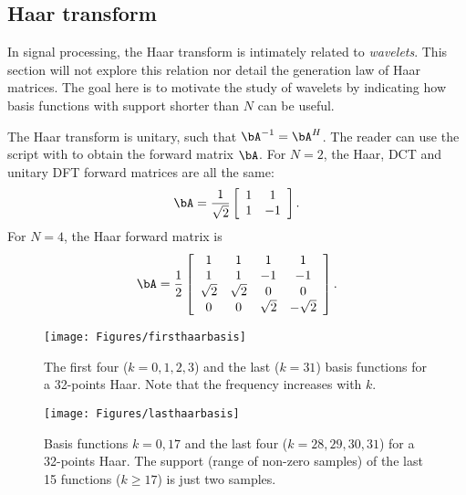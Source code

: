 \subsection{Haar transform}

In signal processing, the Haar transform is intimately related to \emph{wavelets}. This section will not explore this relation nor detail the generation law of Haar matrices. The goal here is to motivate the study of wavelets by indicating how basis functions with support shorter than $N$ can be useful.

The Haar transform is unitary, such that $\bA^{-1}=\bA^H$.
The reader can use the script  with  to obtain the forward matrix $\bA$. For $N=2$, the Haar, DCT and unitary DFT forward matrices are all the same:
\[
\bA = \frac{1}{\sqrt{2}}
\left[ \begin{array}{cc}
1 & 1 \\
1 & -1
\\ \end{array} \right].
\]
For $N=4$, the Haar forward matrix is
\[
\bA = \frac{1}{2}
\left[ \begin{array}{cccc}
1 & 1 & 1 & 1 \\
1 & 1 & -1 & -1 \\
\sqrt{2} & \sqrt{2} & 0 & 0 \\
0 & 0 & \sqrt{2} & -\sqrt{2}
\\ \end{array} \right].
\]

\begin{figure}[htpb]
        \centering
                \texttt{[image: Figures/firsthaarbasis]}              
        \caption[{The first four ($k=0,1,2,3$) and the last ($k=31$) basis functions for a 32-points Haar.}]{The first four ($k=0,1,2,3$) and the last ($k=31$) basis functions for a 32-points Haar. Note that the frequency increases with $k$.\label{fig:firsthaarbasis}}
\end{figure}

\begin{figure}[!htb]
        \centering
                \texttt{[image: Figures/lasthaarbasis]}               
        \caption[{Basis functions $k=0,17$ and the last four ($k=28,29,30,31$) for a 32-points Haar.}]{Basis functions $k=0,17$ and the last four ($k=28,29,30,31$) for a 32-points Haar. The support (range of non-zero samples) of the last 15 functions ($k \ge 17$) is just two samples.\label{fig:lasthaarbasis}}
\end{figure}

